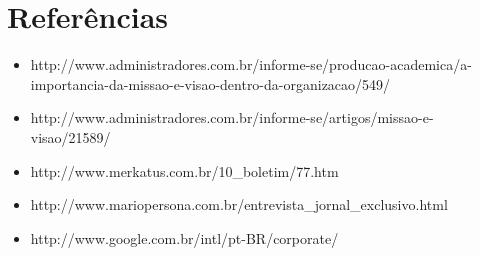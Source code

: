 \documentclass[12pt]{article}
\begin{document}
\section{Referências}

\begin{itemize}

	\item http://www.administradores.com.br/informe-se/producao-academica/a-importancia-da-missao-e-visao-dentro-da-organizacao/549/
	
	\item http://www.administradores.com.br/informe-se/artigos/missao-e-visao/21589/
	
	\item http://www.merkatus.com.br/10\_boletim/77.htm
	
	\item http://www.mariopersona.com.br/entrevista\_jornal\_exclusivo.html
	
	\item http://www.google.com.br/intl/pt-BR/corporate/

\end{itemize}
\end{document}

